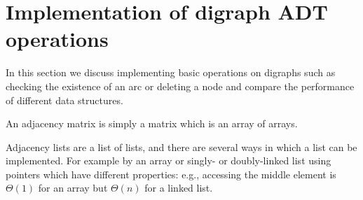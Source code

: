 %
%
%
%
%
%
%
%
%
%
%

\section{Implementation of digraph ADT operations}
\label{sec:graphadtimpl}

In this section we discuss implementing basic operations on digraphs such as checking the existence of an arc or deleting a node and compare the performance of different data structures.



An adjacency matrix is simply a matrix which is an array of arrays. 

Adjacency lists are a list of lists, and there are several ways in which a list can be implemented. For
example by an array or singly- or doubly-linked list using pointers which
have different properties: e.g., accessing the middle element is $\Theta(1)$ for an array but
$\Theta(n)$ for a linked list. 

